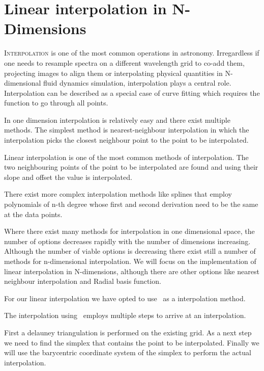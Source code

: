 \chapter{Linear interpolation in N-Dimensions}
\label{chap:ndinterpolation}

\lettrine[lines=4]{I}{nterpolation} is one of the most common operations in astronomy. Irregardless if one needs to resample spectra on a different wavelength grid to co-add them, projecting images to align them or interpolating physical quantities in N-dimensional fluid dynamics simulation, interpolation plays a central role.
Interpolation can be described as a special case of curve fitting which requires the function to go through all points. 

In one dimension interpolation is relatively easy and there exist multiple methods. The simplest method is nearest-neighbour interpolation in which the interpolation picks the closest neighbour point to the point to be interpolated. 

Linear interpolation is one of the most common methods of interpolation. The two neighbouring points of the point to be interpolated are found and using their slope and offset the value is interpolated.

There exist more complex interpolation methods like splines that employ polynomials of n-th degree whose first and second derivation need to be the same at the data points. 

Where there exist many methods for interpolation in one dimensional space, the number of options decreases rapidly with the number of dimensions increasing. 
Although the number of viable options is decreasing there exist still a number of methods for n-dimensional interpolation. We will focus on the implementation of linear interpolation in N-dimensions, although there are other options like nearest neighbour interpolation and Radial basis function.

For our linear interpolation we have opted to use \deltri\ as a interpolation method.

The interpolation using \deltri\ employs multiple steps to arrive at an  interpolation.

First a delauney triangulation is performed on the existing grid. As a next step we need to find the simplex that contains the point to be interpolated. 
Finally we will use the barycentric coordinate system of the simplex to perform the actual interpolation.






